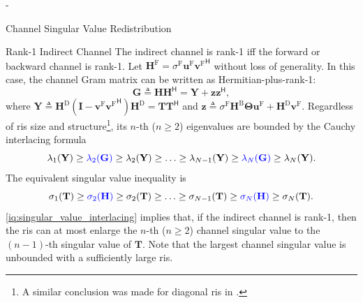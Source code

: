 \documentclass[journal]{IEEEtran}
\begin{document}
\begin{section}{-}
\begin{subsection}{Channel Singular Value Redistribution}
		\begin{subsubsection}{Rank-1 Indirect Channel}
			The indirect channel is rank-1 iff the forward or backward channel is rank-1.
			Let $\mathbf{H}^\mathrm{F} = \sigma^\mathrm{F} \mathbf{u}^\mathrm{F} {\mathbf{v}^\mathrm{F}}^\mathsf{H}$ without loss of generality.
			In this case, the channel Gram matrix can be written as Hermitian-plus-rank-1:
			\begin{equation}
				\mathbf{G} \triangleq \mathbf{H} \mathbf{H}^\mathsf{H} = \mathbf{Y} + \mathbf{z} \mathbf{z}^\mathsf{H},
			\end{equation}
			where $\mathbf{Y} \triangleq \mathbf{H}^\mathrm{D} (\mathbf{I} - \mathbf{v}^\mathrm{F} {\mathbf{v}^\mathrm{F}}^\mathsf{H}) \mathbf{H}^\mathrm{D} = \mathbf{T} \mathbf{T}^\mathsf{H}$ and $\mathbf{z} \triangleq \sigma^\mathrm{F} \mathbf{H}^\mathrm{B} \mathbf{\Theta} \mathbf{u}^\mathrm{F} + \mathbf{H}^\mathrm{D} \mathbf{v}^\mathrm{F}$.
			Regardless of \gls{ris} size and structure\footnote{A similar conclusion was made for diagonal \gls{ris} in \cite{Semmler2023}.}, its $n$-th ($n \ge 2$) eigenvalues are bounded by the Cauchy interlacing formula \cite{Golub2013}
			\begin{equation}
				\lambda_1(\mathbf{Y}) \ge {\color{blue}\lambda_2(\mathbf{G})} \ge \lambda_2(\mathbf{Y}) \ge \ldots \ge \lambda_{N-1}(\mathbf{Y}) \ge {\color{blue}\lambda_N(\mathbf{G})} \ge \lambda_N(\mathbf{Y}).
			\end{equation}
			The equivalent singular value inequality is
			\begin{equation}
				\sigma_1(\mathbf{T}) \ge {\color{blue}\sigma_2(\mathbf{H})} \ge \sigma_2(\mathbf{T}) \ge \ldots \ge \sigma_{N-1}(\mathbf{T}) \ge {\color{blue}\sigma_N(\mathbf{H})} \ge \sigma_N(\mathbf{T}).
				\label{iq:singular_value_interlacing}
			\end{equation}
			\eqref{iq:singular_value_interlacing} implies that, if the indirect channel is rank-1, then the \gls{ris} can at most enlarge the $n$-th ($n \ge 2$) channel singular value to the $(n-1)$-th singular value of $\mathbf{T}$.
			Note that the largest channel singular value is unbounded with a sufficiently large \gls{ris}.
		\end{subsubsection}


\end{subsection}
\end{section}
\end{document}

